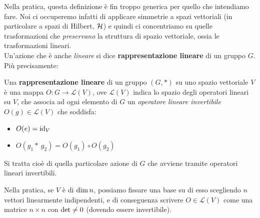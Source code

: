\documentclass[../../FisicaTeorica.tex]{subfiles}
\begin{document}
Nella pratica, questa definizione è fin troppo generica per quello che intendiamo fare. Noi ci occuperemo infatti di applicare simmetrie a spazi vettoriali (in particolare a spazi di Hilbert, $\mathcal{H}$) e quindi ci concentriamo su quelle trasformazioni che \textit{preservano} la struttura di spazio vettoriale, ossia le trasformazioni lineari.\\
Un'azione che è anche \textit{lineare} si dice \textbf{rappresentazione lineare} di un gruppo $G$. Più precisamente:
\begin{dfn}
Una \textbf{rappresentazione lineare} di un gruppo $(G,*)$ su uno spazio vettoriale $V$ è una mappa $O:G\to \mathcal{L}(V)$, ove $\mathcal{L}(V)$ indica lo spazio degli operatori lineari su $V$, che associa ad ogni elemento di $G$ un \textit{operatore lineare invertibile} $O(g) \in \mathcal{L}(V)$ che soddisfa:
\begin{itemize}
\item $O(e) = \operatorname{id}_V$
\item $O(g_1 *\ g_2)=O(g_1)\circ O(g_2)$
\end{itemize}
Si tratta cioè di quella particolare azione di $G$ che avviene tramite operatori lineari invertibili.
\end{dfn}
\begin{comment} %
\begin{expl}
Volendo essere precisi, una rappresentazione lineare è un \textbf{omeomorfismo di gruppi} (di Lie) tra $G$ e il \textbf{gruppo di automorfismo} di $V$, indicato con $GL(V)$.\\
Quest'ultimo è definito infatti come l'insieme di tutti gli \textbf{automorfismi} (ossia gli isomorfismi che collegano $V$ a se stesso), che si può dimostrare avere una struttura di gruppo.\\
Un omeomorfismo di gruppi, d'altro canto, è una qualsiasi mappa $h:G\to H$, dove $(G,*)$ e $(H,\cdot)$ sono gruppi, che verifica $h(u*v) = h(u)\cdot h(v)$.
\end{expl}
\end{comment}
Nella pratica, se $V$ è di $\operatorname{dim} n$, possiamo fissare una base su di esso scegliendo $n$ vettori linearmente indipendenti, e di conseguenza scrivere $O \in \mathcal{L}(V)$ come una matrice $n\times n$ con $\operatorname{det} \neq 0$ (dovendo essere invertibile).\\
\end{document}
